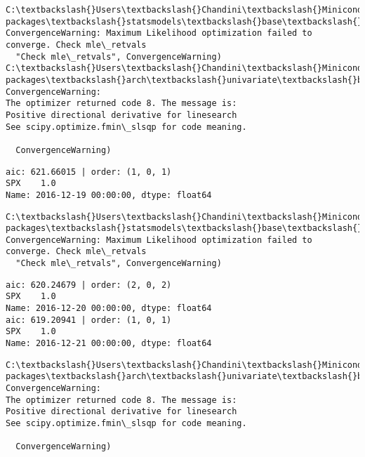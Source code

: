 \documentclass[11pt]{article}
\begin{document}
    \begin{Verbatim}[commandchars=\\\{\}]
C:\textbackslash{}Users\textbackslash{}Chandini\textbackslash{}Miniconda3\textbackslash{}envs\textbackslash{}auquan\textbackslash{}lib\textbackslash{}site-packages\textbackslash{}statsmodels\textbackslash{}base\textbackslash{}model.py:496: ConvergenceWarning: Maximum Likelihood optimization failed to converge. Check mle\_retvals
  "Check mle\_retvals", ConvergenceWarning)
C:\textbackslash{}Users\textbackslash{}Chandini\textbackslash{}Miniconda3\textbackslash{}envs\textbackslash{}auquan\textbackslash{}lib\textbackslash{}site-packages\textbackslash{}arch\textbackslash{}univariate\textbackslash{}base.py:513: ConvergenceWarning: 
The optimizer returned code 8. The message is:
Positive directional derivative for linesearch
See scipy.optimize.fmin\_slsqp for code meaning.

  ConvergenceWarning)

    \end{Verbatim}

    \begin{Verbatim}[commandchars=\\\{\}]
aic: 621.66015 | order: (1, 0, 1)
SPX    1.0
Name: 2016-12-19 00:00:00, dtype: float64

    \end{Verbatim}

    \begin{Verbatim}[commandchars=\\\{\}]
C:\textbackslash{}Users\textbackslash{}Chandini\textbackslash{}Miniconda3\textbackslash{}envs\textbackslash{}auquan\textbackslash{}lib\textbackslash{}site-packages\textbackslash{}statsmodels\textbackslash{}base\textbackslash{}model.py:496: ConvergenceWarning: Maximum Likelihood optimization failed to converge. Check mle\_retvals
  "Check mle\_retvals", ConvergenceWarning)

    \end{Verbatim}

    \begin{Verbatim}[commandchars=\\\{\}]
aic: 620.24679 | order: (2, 0, 2)
SPX    1.0
Name: 2016-12-20 00:00:00, dtype: float64
aic: 619.20941 | order: (1, 0, 1)
SPX    1.0
Name: 2016-12-21 00:00:00, dtype: float64

    \end{Verbatim}

    \begin{Verbatim}[commandchars=\\\{\}]
C:\textbackslash{}Users\textbackslash{}Chandini\textbackslash{}Miniconda3\textbackslash{}envs\textbackslash{}auquan\textbackslash{}lib\textbackslash{}site-packages\textbackslash{}arch\textbackslash{}univariate\textbackslash{}base.py:513: ConvergenceWarning: 
The optimizer returned code 8. The message is:
Positive directional derivative for linesearch
See scipy.optimize.fmin\_slsqp for code meaning.

  ConvergenceWarning)

    \end{Verbatim}
\end{document}
